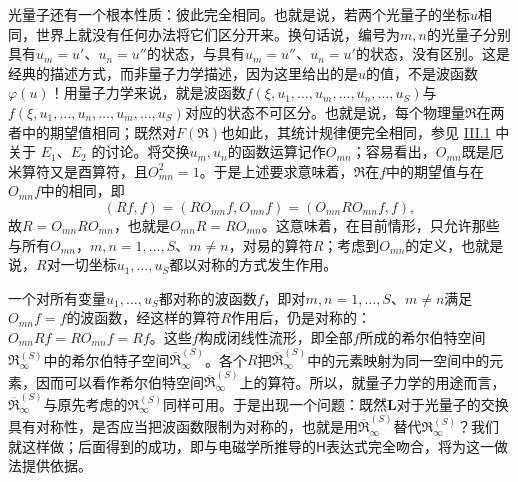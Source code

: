 \documentclass[fontsize=13pt,twoside,openany,headings=normal,parskip=false,bookmarkpackage=false,DIV=calc]{scrbook}
\begin{document}
光量子还有一个根本性质：彼此完全相同。也就是说，若两个光量子的坐标$u$相同，世界上就没有任何办法将它们区分开来。换句话说，编号为$m,\allowbreak n$的光量子分别具有$u_m=u'$、$u_n=u''$的状态，与具有$u_m=u''$、$u_n=u'$的状态，没有区别。这是经典的描述方式，而非量子力学描述，因为这里给出的是$u$的值，不是波函数$\varphi(u)$！用量子力学来说，就是波函数$f(\xi,\allowbreak u_1,\allowbreak \ldots,\allowbreak u_m,\allowbreak \ldots,\allowbreak u_n,\allowbreak \ldots,\allowbreak u_S)$与$f(\xi,\allowbreak u_1,\allowbreak \ldots,\allowbreak u_n,\allowbreak \ldots,\allowbreak u_m,\allowbreak \ldots,\allowbreak u_S)$对应的状态不可区分。也就是说，每个物理量$\mathfrak R$在两者中的期望值相同；既然对$F(\mathfrak R)$也如此，其统计规律便完全相同，参见 \hyperref[sec:III.1]{III.1} 中关于 \hyperref[post:III.1.E1]{$E_1$}、\hyperref[post:III.1.E2]{$E_2$} 的讨论。将交换$u_m,\allowbreak u_n$的函数运算记作$O_{mn}$；容易看出，$O_{mn}$既是厄米算符又是酉算符，且$O_{mn}^2=1$。于是上述要求意味着，$\mathfrak R$在$f$中的期望值与在$O_{mn}f$中的相同，即
\[
 (Rf,f)=(RO_{mn}f,O_{mn}f)=(O_{mn}RO_{mn}f,f),
\]
故$R=O_{mn}RO_{mn}$，也就是$O_{mn}R=RO_{mn}$。这意味着，在目前情形，只允许那些与所有$O_{mn}$，$m,\allowbreak n=1,\allowbreak \ldots,\allowbreak S$、$m\ne n$，对易的算符$R$；考虑到$O_{mn}$的定义，也就是说，$R$对一切坐标$u_1,\allowbreak \ldots,\allowbreak u_S$都以对称的方式发生作用。

一个对所有变量$u_1,\allowbreak \ldots,\allowbreak u_S$都对称的波函数$f$，即对$m,\allowbreak n=1,\allowbreak \ldots,\allowbreak S$、$m\ne n$满足$O_{mn}f=f$的波函数，经这样的算符$R$作用后，仍是对称的：$O_{mn}Rf=RO_{mn}f=Rf$。这些$f$构成闭线性流形，即全部$f$所成的希尔伯特空间$\mathfrak R_{\infty}^{(S)}$中的希尔伯特子空间$\overline{\mathfrak R}_{\infty}^{(S)}$。\hypertarget{origpage-147}{}\label{origpage-147}各个$R$把$\overline{\mathfrak R}_{\infty}^{(S)}$中的元素映射为同一空间中的元素，因而可以看作希尔伯特空间$\overline{\mathfrak R}_{\infty}^{(S)}$上的算符。所以，就量子力学的用途而言，$\overline{\mathfrak R}_{\infty}^{(S)}$与原先考虑的$\mathfrak R_{\infty}^{(S)}$同样可用。于是出现一个问题：既然$\boldsymbol{L}$对于光量子的交换具有对称性，是否应当把波函数限制为对称的，也就是用$\overline{\mathfrak R}_{\infty}^{(S)}$替代$\mathfrak R_{\infty}^{(S)}$？我们就这样做；后面得到的成功，即与电磁学所推导的$\mathsf{H}$表达式完全吻合，将为这一做法提供依据。
\end{document}
